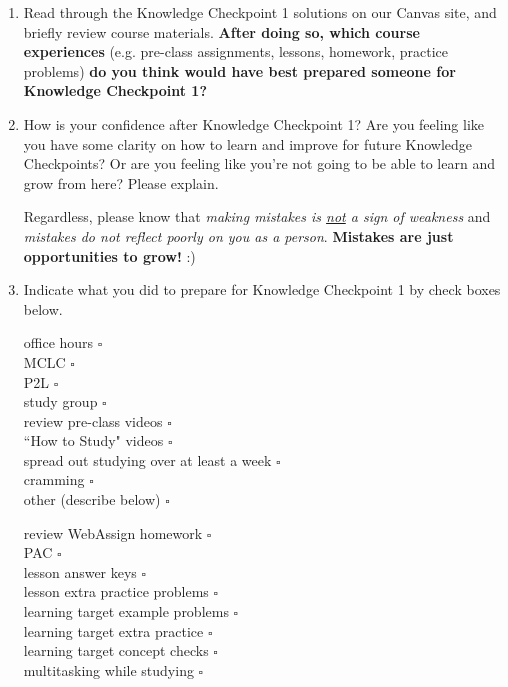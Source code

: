 \documentclass[10pt]{article}
\begin{document}
\begin{enumerate}

\item Read through the Knowledge Checkpoint 1 solutions on our Canvas site, and briefly review course materials. {\bf After doing so, which course experiences} (e.g. pre-class assignments, lessons, homework, practice problems) {\bf do you think would have best prepared someone for Knowledge Checkpoint 1?}

    \vfill

\item How is your confidence after Knowledge Checkpoint 1? Are you feeling like you have some clarity on how to learn and improve for future Knowledge Checkpoints? Or are you feeling like you're not going to be able to learn and grow from here? Please explain. 

\vfill

Regardless, please know that {\it making mistakes is \underline{not} a sign of weakness} and {\it mistakes do not reflect poorly on you as a person}. {\bf Mistakes are just opportunities to  grow!} :)

\newpage

\item Indicate what you did to prepare for Knowledge Checkpoint 1 by check boxes below. \\

\begin{minipage}[t][2.5in][t]{0.45\textwidth}
office hours \dotfill $\square$\\[0.1in]
MCLC \dotfill $\square$\\[0.1in]
P2L \dotfill $\square$\\[0.1in]
study group \dotfill $\square$\\[0.1in]
review pre-class videos \dotfill $\square$\\[0.1in]
``How to Study" videos \dotfill $\square$\\[0.1in]
spread out studying over at least a week \dotfill $\square$\\[0.1in]
cramming \dotfill $\square$\\[0.1in]
other (describe below) \dotfill $\square$\\[0.1in]
\end{minipage}
\hfill
\begin{minipage}[t][2.5in][t]{.45\textwidth}
review WebAssign homework \dotfill $\square$\\[0.1in]
PAC \dotfill $\square$\\[0.1in]
lesson answer keys \dotfill $\square$\\[0.1in]
lesson extra practice problems \dotfill $\square$\\[0.1in]
learning target example problems \dotfill $\square$\\[0.1in]
learning target extra practice \dotfill $\square$\\[0.1in]
learning target concept checks \dotfill $\square$\\[0.1in]
multitasking while studying \dotfill $\square$\\[0.1in]
\end{minipage}
\hfill\,


\end{enumerate}
\end{document}
